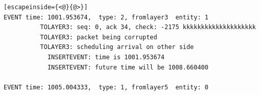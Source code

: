 \documentclass[paper=a4, fontsize=11pt]{scrartcl}
\numberwithin{equation}{section}		%
\numberwithin{figure}{section}			%
\numberwithin{table}{section}				%
\begin{document}
\begin{lstlisting}[escapeinside={<@}{@>}]
EVENT time: 1001.953674,  type: 2, fromlayer3  entity: 1
          TOLAYER3: seq: 0, ack 34, check: -2175 kkkkkkkkkkkkkkkkkkkk
          TOLAYER3: packet being corrupted
          TOLAYER3: scheduling arrival on other side
            INSERTEVENT: time is 1001.953674
            INSERTEVENT: future time will be 1008.660400

EVENT time: 1005.004333,  type: 1, fromlayer5  entity: 0

\end{lstlisting}


\end{document}
